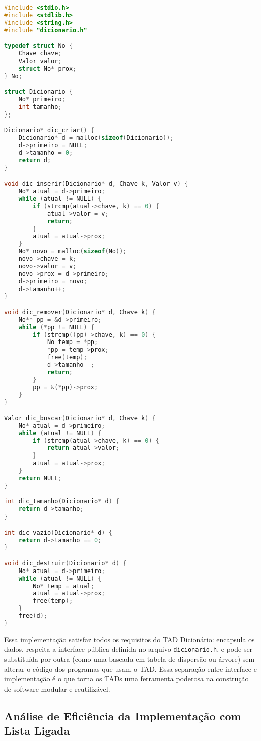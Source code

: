\begin{lstlisting}[language=C, caption={Implementação do TAD Dicionário com lista ligada}, label={lst:dicionario-lista}]
#include <stdio.h>
#include <stdlib.h>
#include <string.h>
#include "dicionario.h"

typedef struct No {
	Chave chave;
	Valor valor;
	struct No* prox;
} No;

struct Dicionario {
	No* primeiro;
	int tamanho;
};

Dicionario* dic_criar() {
	Dicionario* d = malloc(sizeof(Dicionario));
	d->primeiro = NULL;
	d->tamanho = 0;
	return d;
}

void dic_inserir(Dicionario* d, Chave k, Valor v) {
	No* atual = d->primeiro;
	while (atual != NULL) {
		if (strcmp(atual->chave, k) == 0) {
			atual->valor = v;
			return;
		}
		atual = atual->prox;
	}
	No* novo = malloc(sizeof(No));
	novo->chave = k;
	novo->valor = v;
	novo->prox = d->primeiro;
	d->primeiro = novo;
	d->tamanho++;
}

void dic_remover(Dicionario* d, Chave k) {
	No** pp = &d->primeiro;
	while (*pp != NULL) {
		if (strcmp((pp)->chave, k) == 0) {
			No temp = *pp;
			*pp = temp->prox;
			free(temp);
			d->tamanho--;
			return;
		}
		pp = &(*pp)->prox;
	}
}

Valor dic_buscar(Dicionario* d, Chave k) {
	No* atual = d->primeiro;
	while (atual != NULL) {
		if (strcmp(atual->chave, k) == 0) {
			return atual->valor;
		}
		atual = atual->prox;
	}
	return NULL;
}

int dic_tamanho(Dicionario* d) {
	return d->tamanho;
}

int dic_vazio(Dicionario* d) {
	return d->tamanho == 0;
}

void dic_destruir(Dicionario* d) {
	No* atual = d->primeiro;
	while (atual != NULL) {
		No* temp = atual;
		atual = atual->prox;
		free(temp);
	}
	free(d);
}
\end{lstlisting}

Essa implementação satisfaz todos os requisitos do TAD Dicionário: encapsula os dados, respeita a interface pública definida no arquivo \texttt{dicionario.h}, e pode ser substituída por outra (como uma baseada em tabela de dispersão ou árvore) sem alterar o código dos programas que usam o TAD.
Essa separação entre interface e implementação é o que torna os TADs uma ferramenta poderosa na construção de software modular e reutilizável.

\subsection{Análise de Eficiência da Implementação com Lista Ligada}

